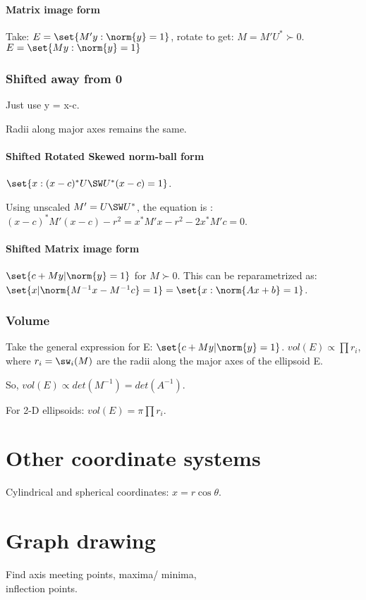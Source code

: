\documentclass[oneside, article]{memoir}
\begin{document}
\paragraph*{Matrix image form}
Take: $E = \set{M' y: \norm{y} = 1}$, rotate to get: $M = M' U^{*} \succ 0$. $E = \set{M y: \norm{y} = 1}$

\subsubsection{Shifted away from 0}
Just use y = x-c.

Radii along major axes remains the same.

\paragraph*{Shifted Rotated Skewed norm-ball form}
$\set{x: (x-c)^{*}U\SW U^{*}(x-c) = 1}$.

Using unscaled $M'=U\SW U^{*}$, the equation is : $(x-c)^{*}M'(x-c) - r^{2} = x^{*}M'x - r^{2} - 2x^{*}M'c = 0$.

\paragraph*{Shifted Matrix image form}
$\set{c + My | \norm{y} = 1}$ for $M \succ 0$. This can be reparametrized as: $\set{x | \norm{M^{-1}x - M^{-1}c} = 1} = \set{x: \norm{Ax + b } = 1}$.

\subsubsection{Volume}
Take the general expression for E: $\set{c + My | \norm{y} = 1}$. $vol(E) \propto \prod r_i$, where $r_i = \sw_i(M)$ are the radii along the major axes of the ellipsoid E. \why

So, $vol(E) \propto det(M^{-1}) = det(A^{-1})$.

For 2-D ellipsoids: $vol(E) = \pi\prod r_i$.

\section{Other coordinate systems}
Cylindrical and spherical coordinates: $x=r \cos \theta$.

\section{Graph drawing}
Find axis meeting points, maxima/ minima, \\
inflection points.
\end{document}
